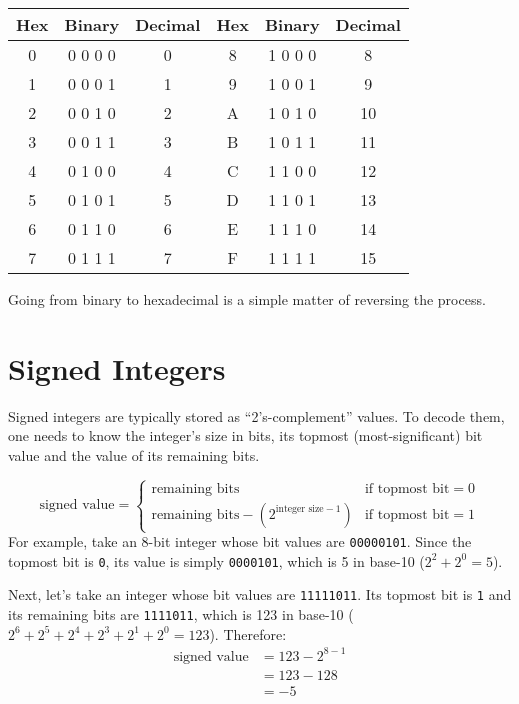 
\begin{tabular}{| c | c | c || c | c | c |}
\hline
Hex & Binary & Decimal & Hex & Binary & Decimal \\
\hline
0 & 0 0 0 0 & 0 & 8 & 1 0 0 0 & 8 \\
1 & 0 0 0 1 & 1 & 9 & 1 0 0 1 & 9 \\
2 & 0 0 1 0 & 2 & A & 1 0 1 0 & 10 \\
3 & 0 0 1 1 & 3 & B & 1 0 1 1 & 11 \\
4 & 0 1 0 0 & 4 & C & 1 1 0 0 & 12 \\
5 & 0 1 0 1 & 5 & D & 1 1 0 1 & 13 \\
6 & 0 1 1 0 & 6 & E & 1 1 1 0 & 14 \\
7 & 0 1 1 1 & 7 & F & 1 1 1 1 & 15 \\
\hline
\end{tabular}
\begin{flushleft}
Going from binary to hexadecimal is a simple matter of reversing
the process.
\end{flushleft}

\section{Signed Integers}
\label{signed_ints}
Signed integers are typically stored as ``2's-complement'' values.
To decode them, one needs to know the integer's size in bits, its
topmost (most-significant) bit value and the value of its remaining bits.

\begin{equation}
\text{signed value} =
\begin{cases}
\text{remaining bits} & \text{if topmost bit} = 0 \\
\text{remaining bits} - (2 ^ {\text{integer size} - 1}) & \text{if topmost bit} = 1
\end{cases}
\end{equation}
For example, take an 8-bit integer whose bit values are \texttt{00000101}.
Since the topmost bit is \texttt{0}, its value is simply \texttt{0000101},
which is 5 in base-10 ($2 ^ 2 + 2 ^ 0 = 5$).

Next, let's take an integer whose bit values are \texttt{11111011}.
Its topmost bit is \texttt{1} and its remaining bits are \texttt{1111011},
which is 123 in base-10
($2 ^ 6 + 2 ^ 5 + 2 ^ 4 + 2 ^ 3 + 2 ^ 1 + 2 ^ 0 = 123$).
Therefore:
\begin{align*}
\text{signed value} &= 123 - 2 ^ {8 - 1} \\
 &= 123 - 128 \\
 &= -5
\end{align*}

